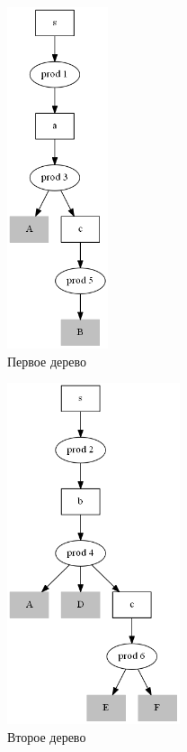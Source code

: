 \begin{figure}[h]
    \centering
    \begin{subfigure}{0.25\textwidth}
        \includegraphics[height=100mm]{Pictures/SPPF_proof_fst}
        \caption*{Первое дерево}
    \end{subfigure}
    \qquad
    \begin{subfigure}{0.25\textwidth}
        \includegraphics[height=100mm]{Pictures/SPPF_proof_snd}
        \caption*{Второе дерево}
    \end{subfigure}
    \qquad
    \begin{subfigure}{0.25\textwidth}

\end{subfigure}
\end{figure}
